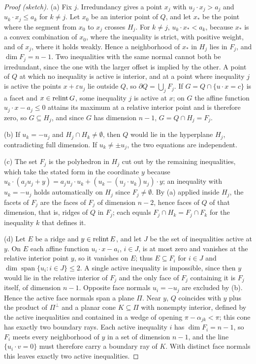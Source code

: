 \documentclass[11pt,letterpaper]{article}
\theoremstyle{plain}
\begin{document}
\begin{proof}[Proof (sketch)]
(a) Fix \(j\). Irredundancy gives a point \(x_j\) with \(u_j\cdot x_j>a_j\)
and \(u_k\cdot x_j\le a_k\) for \(k\ne j\). Let \(x_0\) be an interior point of
\(Q\), and let \(x_*\) be the point where the segment from \(x_0\) to \(x_j\)
crosses \(H_j\). For \(k\ne j\), \(u_k\cdot x_*<a_k\), because \(x_*\) is a
convex combination of \(x_0\), where the inequality is strict, with positive
weight, and of \(x_j\), where it holds weakly. Hence a neighborhood of
\(x_*\) in \(H_j\) lies in \(F_j\), and \(\dim F_j=n-1\). Two inequalities
with the same normal cannot both be irredundant, since the one with the
larger offset is implied by the other. A point of \(Q\) at
which no inequality is active is interior, and at a point where
inequality \(j\) is active the points \(x+\varepsilon u_j\) lie outside \(Q\),
so \(\partial Q=\bigcup_jF_j\). If \(G=Q\cap\{u\cdot x=c\}\) is a facet and
\(x\in\operatorname{relint} G\), some inequality \(j\) is active at \(x\); on \(G\) the
affine function \(u_j\cdot x-a_j\le0\) attains its maximum at a relative
interior point and is therefore zero, so \(G\subseteq H_j\), and since \(G\) has
dimension \(n-1\), \(G=Q\cap H_j=F_j\).

(b) If \(u_k=-u_j\) and \(H_j\cap H_k\ne\emptyset\), then \(Q\) would lie in
the hyperplane \(H_j\), contradicting full dimension. If \(u_k\ne\pm u_j\),
the two equations are independent.

(c) The set \(F_j\) is the polyhedron in \(H_j\) cut out by the remaining
inequalities, which take the stated form in the coordinate \(y\) because
\(u_k\cdot(a_ju_j+y)=a_ju_j\cdot u_k+(u_k-(u_j\cdot u_k)u_j)\cdot y\); an
inequality with \(u_k=-u_j\) holds automatically on \(H_j\) since
\(F_j\ne\emptyset\). By (a) applied inside \(H_j\), the facets of \(F_j\) are
the faces of \(F_j\) of dimension \(n-2\), hence faces of \(Q\) of that
dimension, that is, ridges of \(Q\) in \(F_j\); each equals
\(F_j\cap H_k=F_j\cap F_k\) for the inequality \(k\) that defines it.

(d) Let \(E\) be a ridge and \(y\in\operatorname{relint} E\), and let \(J\) be the set of
inequalities active at \(y\). On \(E\) each affine function
\(u_i\cdot x-a_i\), \(i\in J\), is at most zero and vanishes at the relative
interior point \(y\), so it vanishes on \(E\); thus \(E\subseteq F_i\) for
\(i\in J\) and \(\dim\operatorname{span}\{u_i:i\in J\}\le2\). A single active
inequality is impossible, since then \(y\) would lie in the relative interior
of \(F_j\) and the only face of \(F_j\) containing it is \(F_j\) itself, of
dimension \(n-1\). Opposite face normals \(u_i=-u_j\) are excluded by (b). Hence
the active face normals span a plane \(\Pi\). Near \(y\), \(Q\) coincides with
\(y\) plus the product of \(\Pi^\perp\) and a planar cone \(K\subseteq\Pi\)
with nonempty interior, defined by the active inequalities and contained in
a wedge of opening \(\pi-\alpha_{jk}<\pi\); this cone has exactly two
boundary rays. Each active inequality \(i\) has \(\dim F_i=n-1\), so
\(F_i\) meets every neighborhood of \(y\) in a set of dimension \(n-1\), and
the line \(\{u_i\cdot v=0\}\) must therefore carry a boundary ray of \(K\).
With distinct face normals this leaves exactly two active inequalities.
\end{proof}
\end{document}
